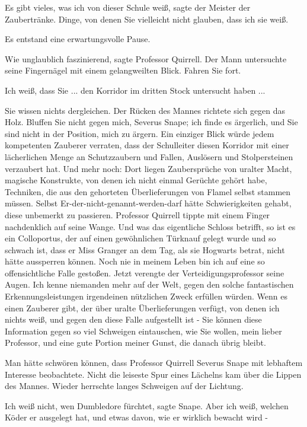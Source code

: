 \glqq Es gibt vieles, was ich von dieser Schule weiß\grqq{}, sagte der Meister
der Zaubertränke. \glqq Dinge, von denen Sie vielleicht nicht glauben, dass ich
sie weiß.\grqq{}

Es entstand eine erwartungsvolle Pause.

\glqq Wie unglaublich faszinierend\grqq{}, sagte Professor Quirrell. Der Mann
untersuchte seine Fingernägel mit einem gelangweilten Blick. \glqq Fahren Sie
fort.\grqq{}

\glqq Ich weiß, dass Sie ... den Korridor im dritten Stock untersucht haben
...\grqq{}

\glqq Sie wissen nichts dergleichen.\grqq{} Der Rücken des Mannes richtete sich
gegen das Holz. \glqq Bluffen Sie nicht gegen mich, Severus Snape; ich finde es
ärgerlich, und Sie sind nicht in der Position, mich zu ärgern. Ein einziger
Blick würde jedem kompetenten Zauberer verraten, dass der Schulleiter diesen
Korridor mit einer lächerlichen Menge an Schutzzaubern und Fallen, Auslösern und
Stolpersteinen verzaubert hat. Und mehr noch: Dort liegen Zaubersprüche von
uralter Macht, magische Konstrukte, von denen ich nicht einmal Gerüchte gehört
habe, Techniken, die aus den gehorteten Überlieferungen von Flamel selbst
stammen müssen. Selbst Er-der-nicht-genannt-werden-darf hätte Schwierigkeiten
gehabt, diese unbemerkt zu passieren.\grqq{} Professor Quirrell tippte mit einem
Finger nachdenklich auf seine Wange. \glqq Und was das eigentliche Schloss
betrifft, so ist es ein Colloportus, der auf einen gewöhnlichen Türknauf gelegt
wurde und so schwach ist, dass er Miss Granger an dem Tag, als sie Hogwarts
betrat, nicht hätte aussperren können. Noch nie in meinem Leben bin ich auf eine
so offensichtliche Falle gestoßen.\grqq{} Jetzt verengte der
Verteidigungsprofessor seine Augen. \glqq Ich kenne niemanden mehr auf der Welt,
gegen den solche fantastischen Erkennungsleistungen irgendeinen nützlichen Zweck
erfüllen würden. Wenn es einen Zauberer gibt, der über uralte Überlieferungen
verfügt, von denen ich nichts weiß, und gegen den diese Falle aufgestellt ist -
Sie können diese Information gegen so viel Schweigen eintauschen, wie Sie
wollen, mein lieber Professor, und eine gute Portion meiner Gunst, die danach
übrig bleibt.\grqq{}

Man hätte schwören können, dass Professor Quirrell Severus Snape mit lebhaftem
Interesse beobachtete. Nicht die leiseste Spur eines Lächelns kam über die
Lippen des Mannes. Wieder herrschte langes Schweigen auf der Lichtung.

\glqq Ich weiß nicht, wen Dumbledore fürchtet\grqq{}, sagte Snape. \glqq Aber
ich weiß, welchen Köder er ausgelegt hat, und etwas davon, wie er wirklich
bewacht wird -\grqq{}

